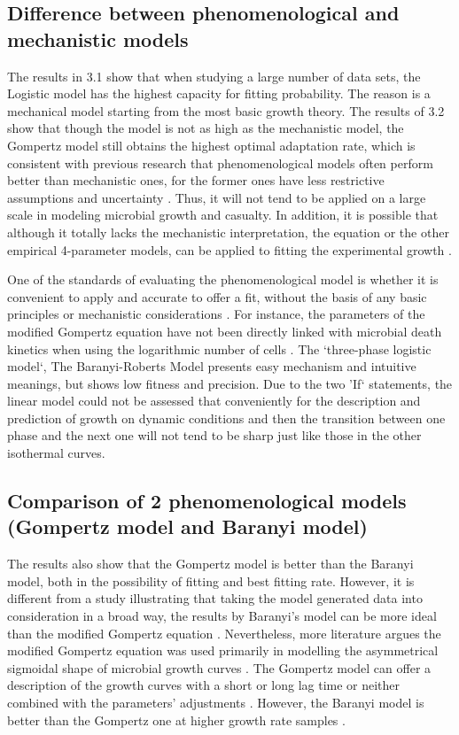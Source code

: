 \documentclass[11pt]{article}
\begin{document}
\subsection{Difference between phenomenological and mechanistic models}
The results in 3.1 show that when studying a large number of data sets, the Logistic model has the highest capacity for fitting probability. The reason is a mechanical model starting from the most basic growth theory. The results of 3.2 show that though the model is not as high as the mechanistic model, the Gompertz model still obtains the highest optimal adaptation rate, which is consistent with previous research that phenomenological models often perform better than mechanistic ones, for the former ones have less restrictive assumptions and uncertainty \citep{R21, R22, R23}. Thus, it will not tend to be applied on a large scale in modeling microbial growth and casualty. In addition, it is possible that although it totally lacks the mechanistic interpretation, the equation or the other empirical 4-parameter models, can be applied to fitting the experimental growth \citep{R20}. 

One of the standards of evaluating the phenomenological model is whether it is convenient to apply and accurate to offer a fit, without the basis of any basic principles or mechanistic considerations \citep{R6}. For instance, the parameters of the modified Gompertz equation have not been directly linked with microbial death kinetics when using the logarithmic number of cells \citep{R8}. 
The ‘three-phase logistic model‘, The Baranyi-Roberts Model presents easy mechanism and intuitive meanings, but shows low fitness and precision. Due to the two ’If‘ statements, the linear model could not be assessed that conveniently for the description and prediction of growth on dynamic conditions and then the transition between one phase and the next one will not tend to be sharp just like those in the other isothermal curves. 

\subsection{Comparison of 2 phenomenological models (Gompertz model and Baranyi model)}
The results also show that the Gompertz model is better than the Baranyi model, both in the possibility of fitting and best fitting rate. However, it is different from a study illustrating that taking the model generated data into consideration in a broad way, the results by Baranyi’s model can be more ideal than the modified Gompertz equation \citep{R8, R26}. Nevertheless, more literature argues the modified Gompertz equation was used primarily in modelling the asymmetrical sigmoidal shape of microbial growth curves \citep{R24, R4, R5}. The Gompertz model can offer a description of the growth curves with a short or long lag time or neither combined with the parameters’ adjustments \citep{R6}. However, the Baranyi model is better than the Gompertz one at higher growth rate samples \citep{R14}. 
\end{document}
